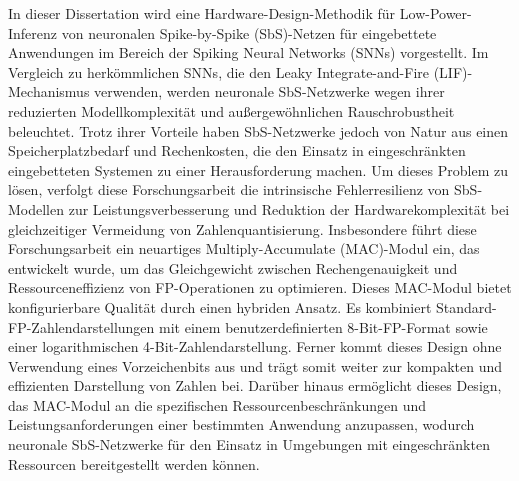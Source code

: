 \documentclass{article}
\begin{document}
In dieser Dissertation wird eine Hardware-Design-Methodik f\"ur Low-Power-Inferenz von neuronalen Spike-by-Spike (SbS)-Netzen f\"ur eingebettete Anwendungen im Bereich der Spiking Neural Networks (SNNs) vorgestellt. Im Vergleich zu herk\"ommlichen SNNs, die den Leaky Integrate-and-Fire (LIF)-Mechanismus verwenden, werden neuronale SbS-Netzwerke wegen ihrer reduzierten Modellkomplexit\"at und au\ss{}ergew\"ohnlichen Rauschrobustheit beleuchtet. Trotz ihrer Vorteile haben SbS-Netzwerke jedoch von Natur aus einen Speicherplatzbedarf und Rechenkosten, die den Einsatz in eingeschr\"ankten eingebetteten Systemen zu einer Herausforderung machen. Um dieses Problem zu l\"osen, verfolgt diese Forschungsarbeit die intrinsische Fehlerresilienz von SbS-Modellen zur Leistungsverbesserung und Reduktion der Hardwarekomplexit\"at bei gleichzeitiger Vermeidung von Zahlenquantisierung. Insbesondere f\"uhrt diese Forschungsarbeit ein neuartiges Multiply-Accumulate (MAC)-Modul ein, das entwickelt wurde, um das Gleichgewicht zwischen Rechengenauigkeit und Ressourceneffizienz von FP-Operationen zu optimieren. Dieses MAC-Modul bietet konfigurierbare Qualit\"at durch einen hybriden Ansatz. Es kombiniert Standard-FP-Zahlendarstellungen mit einem benutzerdefinierten 8-Bit-FP-Format sowie einer logarithmischen 4-Bit-Zahlendarstellung. Ferner kommt dieses Design ohne Verwendung eines Vorzeichenbits aus und tr\"agt somit weiter zur kompakten und effizienten Darstellung von Zahlen bei. Dar\"uber hinaus erm\"oglicht dieses Design, das MAC-Modul an die spezifischen Ressourcenbeschr\"ankungen und Leistungsanforderungen einer bestimmten Anwendung anzupassen, wodurch neuronale SbS-Netzwerke f\"ur den Einsatz in Umgebungen mit eingeschr\"ankten Ressourcen bereitgestellt werden k\"onnen.
\end{document}
